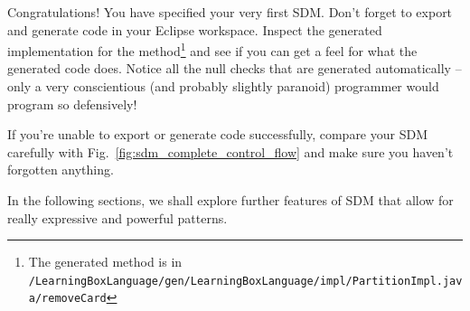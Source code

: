 Congratulations!  You have specified your very first SDM.  
Don't forget to export and generate code in your Eclipse workspace. 
Inspect the generated implementation for the method\footnote{The generated method is in \texttt{/Learning\-Box\-Language/\-gen/\-Learning\-Box\-Language/\-impl/\-Partition\-Impl.java/\-remove\-Card}} and see if you can get a feel for what the generated code does. 
Notice all the null checks that are generated automatically -- only a very conscientious (and probably slightly paranoid) programmer would program so defensively!

If you're unable to export or generate code successfully, compare your SDM carefully with Fig.~\ref{fig:sdm_complete_control_flow} and make sure you haven't forgotten anything.

In the following sections, we shall explore further features of SDM that allow for really expressive and powerful patterns.
